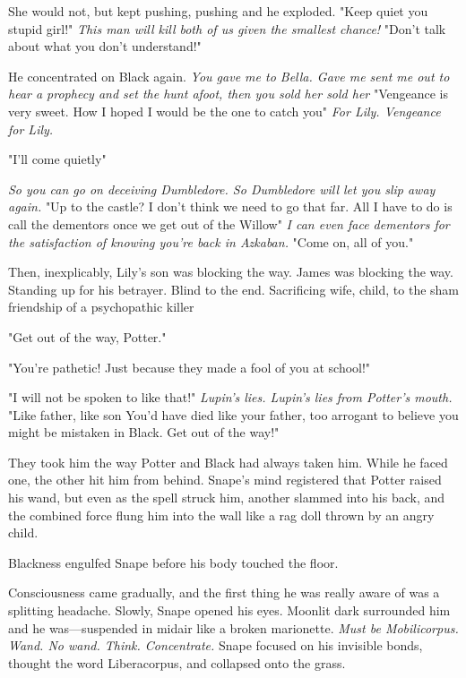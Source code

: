 She would not, but kept pushing, pushing{\el} and he exploded. "Keep quiet you stupid girl!" \emph{This man will kill both of us given the smallest chance!} "Don't talk about what you don't understand!"

He concentrated on Black again. \emph{You gave me to Bella. Gave me{\el} sent me out to hear a prophecy and set the hunt afoot, then you sold her{\el} sold her{\el}} "Vengeance is very sweet. How I hoped I would be the one to catch you{\el}" \emph{For Lily. Vengeance for Lily.}

"{\el}I'll come quietly{\el}"

\emph{So you can go on deceiving Dumbledore. So Dumbledore will let you slip away again. }"Up to the castle? I don't think we need to go that far. All I have to do is call the dementors once we get out of the Willow{\el}" \emph{I can even face dementors for the satisfaction of knowing you're back in Azkaban.} "Come on, all of you."

Then, inexplicably, Lily's son was blocking the way. James was blocking the way. Standing up for his betrayer. Blind to the end. Sacrificing wife, child, to the sham friendship of a psychopathic killer{\el}

"Get out of the way, Potter."

"You're pathetic! Just because they made a fool of you at school{\el}!"

"I will not be spoken to like that!" \emph{Lupin's lies. Lupin's lies from Potter's mouth.} "Like father, like son{\el} You'd have died like your father, too arrogant to believe you might be mistaken in Black. Get out of the way!"

They took him the way Potter and Black had always taken him. While he faced one, the other hit him from behind. Snape's mind registered that Potter raised his wand, but even as the spell struck him, another slammed into his back, and the combined force flung him into the wall like a rag doll thrown by an angry child.

Blackness engulfed Snape before his body touched the floor.

\sbreak

Consciousness came gradually, and the first thing he was really aware of was a splitting headache. Slowly, Snape opened his eyes. Moonlit dark surrounded him and he was—suspended in midair like a broken marionette. \emph{Must be{\el} Mobilicorpus. Wand. No wand. Think. Concentrate.} Snape focused on his invisible bonds, thought the word Liberacorpus, and collapsed onto the grass.


